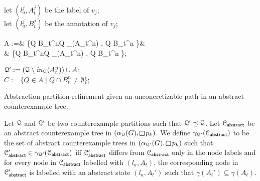 \bigskip

\begin{algorithm}[h!]

{}

\smallskip

let $(l_a^j,A_t^j)$ be the label of $v_j$;\\
let $(l_a^j,B_t^j)$ be the annotation of $v_j$;
\begin{flalign*}
A  :=&  \{Q \cap B_t^n\mid Q \in \inabs_\partition(A_t^n) , Q \cap B_t^n \neq \emptyset \}\cup &\\
& \{Q \setminus B_t^n\mid Q \in \inabs_\partition(A_t^n) , Q \setminus B_t^n \neq \emptyset \};
\end{flalign*}

$\mathcal{Q}' := (\mathcal{Q} \setminus \mathit{in}_{\mathcal{Q}}(A_t^n))  \cup A$;\\
$C := \{ Q\in A \mid Q \cap B_t^n \neq \emptyset\}$;


\smallskip
\bigskip
\caption{Abstraction partition refinement given an unconcretizable path in an  abstract counterexample tree.}
\label{algo:refinement-safety}

\end{algorithm}

Let $\mathcal{Q}$ and $\mathcal{Q}'$ be two counterexample partitions such that $\mathcal{Q}' \preceq \mathcal{Q}$. Let $\mathcal{C}_{\mathsf{abstract}}$ be an abstract counterexample  tree in $(\alpha_\partition(G),\LTLglobally p_k)$. We define $\gamma_{\mathcal{Q}'}(\mathcal{C}_{\mathsf{abstract}})$ to be the set of abstract counterexample trees in $(\alpha_{\partition'}(G),\LTLglobally p_k)$ such that $\mathcal{C}'_{\mathsf{abstract}} \in \gamma_{\mathcal{Q}'}(\mathcal{C}_{\mathsf{abstract}})$ iff $\mathcal{C}'_{\mathsf{abstract}}$ differs from $\mathcal{C}_{\mathsf{abstract}}$ only in the node labels and for every node in $\mathcal{C}_{\mathsf{abstract}}$ labelled with $(l_a,A_t)$, the corresponding node in $\mathcal{C}'_{\mathsf{abstract}}$ is labelled with an abstract state $(l_a,A_t')$ such that $\gamma(A_t') \subseteq \gamma(A_t)$.
 
